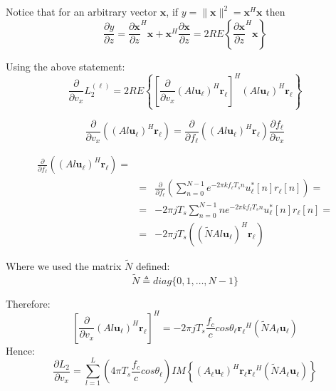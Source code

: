 \documentclass[10pt,a4paper]{report}
\begin{document}
Notice that for an arbitrary vector $\mathbf{x}$, if $y=\|\mathbf{x}\|^2=\mathbf{x}^H\mathbf{x}$ then
$$ \frac{\partial y}{\partial z} = \frac{\partial \mathbf{x}}{\partial z}^H\mathbf{x}+ \mathbf{x}^H\frac{\partial \mathbf{x}}{\partial z}=2RE\left\{ \frac{\partial \mathbf{x}}{\partial z}^H\mathbf{x} \right\} $$

Using the above statement:
\begin{equation}
\frac{\partial}{\partial v_x} L_2^{(\ell)}  = 2 RE
\left\{ 
\left[\frac{\partial}{\partial v_x} (Al \mathbf{u_\ell})^H \mathbf{r_\ell}\right]^H(Al \mathbf{u_\ell})^H \mathbf{r_\ell}
\right\}
\end{equation}

\begin{equation}
\label{eq:da_l_d_v_x}
\frac{\partial}{\partial v_x}\left( (Al \mathbf{u_\ell})^H \mathbf{r_\ell}\right) = \frac{\partial}{\partial f_\ell}\left( (Al \mathbf{u_\ell})^H \mathbf{r_\ell}\right) \frac{\partial f_\ell}{\partial v_x}
\end{equation}

\begin{eqnarray}
\frac{\partial}{\partial f_\ell}\left( (Al \mathbf{u_\ell})^H \mathbf{r_\ell}\right) = \\
&=& \frac{\partial}{\partial f_\ell} \left(
\sum_{n=0}^{N-1}e^{-2 \pi k f_\ell T_s n}u_\ell^*[n]r_\ell[n]
\right) = \nonumber\\
&=& -2 \pi j T_s \sum_{n=0}^{N-1}ne^{-2 \pi k f_\ell T_s n}u_\ell^*[n]r_\ell[n] = 
\nonumber\\
&=& -2 \pi j T_s \left( (\tilde{N} Al \mathbf{u_\ell})^H \mathbf{r_\ell}\right) \nonumber
\end{eqnarray}

Where we used the matrix $ \tilde{N}$ defined:
\begin{equation}
\tilde{N} \triangleq diag\{0,1,\dots ,N-1\}
\end{equation}

Therefore:
\begin{equation}
\left[\frac{\partial}{\partial v_x} (Al \mathbf{u_\ell})^H \mathbf{r_\ell}\right]^H = -2 \pi j T_s \frac{f_c}{c}cos\theta_\ell\mathbf{r_\ell}^H(\tilde{N} A_\ell \mathbf{u_\ell})
\end{equation}
Hence:
\begin{equation}
\frac{\partial L_2}{\partial v_x} = \sum_{l=1}^L (4 \pi T_s\frac{f_c}{c} cos\theta_\ell) IM
\left\{
(A_\ell \mathbf{u_\ell})^H \mathbf{r_\ell}\mathbf{r_\ell}^H (\tilde{N}A_\ell\mathbf{u_\ell})
\right\}
\end{equation}
\end{document}

